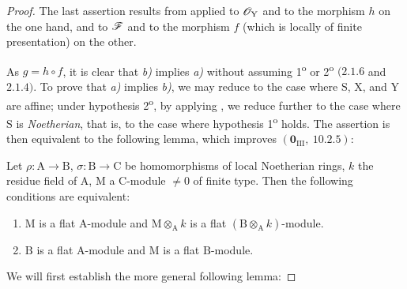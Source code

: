 \begin{proof}
The last assertion results from  applied to $\mathscr{O}_\mathrm{Y}$ and to the morphism $h$ on the one hand, and to $\mathscr{F}$ and to the morphism $f$ (which is locally of finite presentation) on the other.

As $g=h\circ f$, it is clear that \emph{b)} implies \emph{a)} without assuming 1\textsuperscript{o} or 2\textsuperscript{o} $(2.1.6$ and $2.1.4)$. To prove that \emph{a)} implies \emph{b)}, we may reduce to the case where $\mathrm{S}$, $\mathrm{X}$, and $\mathrm{Y}$ are affine; under hypothesis 2\textsuperscript{o}, by applying , we reduce further to the case where $\mathrm{S}$ is \emph{Noetherian}, that is, to the case where hypothesis 1\textsuperscript{o} holds. The assertion is then equivalent to the following lemma, which improves $(\mathbf{0}_{\mathrm{III}},~10.2.5)$:

\begin{lemma}[11.3.10.1]
\label{IV.11.3.10.1}
Let $\rho:\mathrm{A}\to\mathrm{B}$, $\sigma:\mathrm{B}\to\mathrm{C}$ be homomorphisms of local Noetherian rings, $k$ the residue field of $\mathrm{A}$, $\mathrm{M}$ a $\mathrm{C}$-module $\neq 0$ of finite type. Then the following conditions are equivalent:
\begin{enumerate}[label=\emph{\alph*)}]
  \item $\mathrm{M}$ is a flat $\mathrm{A}$-module and $\mathrm{M}\otimes_\mathrm{A} k$ is a flat $(\mathrm{B}\otimes_\mathrm{A} k)$-module.
  \item $\mathrm{B}$ is a flat $\mathrm{A}$-module and $\mathrm{M}$ is a flat $\mathrm{B}$-module.
\end{enumerate}
\end{lemma}

We will first establish the more general following lemma:


\end{proof}
